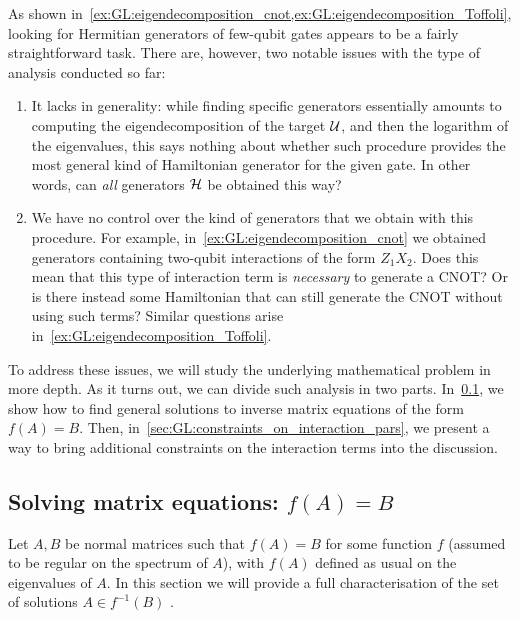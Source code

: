 As shown in~\cref{ex:GL:eigendecomposition_cnot,ex:GL:eigendecomposition_Toffoli}, looking for Hermitian generators of few-qubit gates appears to be a fairly straightforward task. There are, however, two notable issues with the type of analysis conducted so far:
\begin{enumerate}
    \item It lacks in generality: while finding specific generators essentially amounts to computing the eigendecomposition of the target ${\mathcal{U}}$, and then the logarithm of the eigenvalues, this says nothing about whether such procedure provides the most general kind of Hamiltonian generator for the given gate. In other words, can \textit{all} generators ${\mathcal{H}}$ be obtained this way?
    \item We have no control over the kind of generators that we obtain with this procedure. For example, in~\cref{ex:GL:eigendecomposition_cnot} we obtained generators containing two-qubit interactions of the form $Z_1 X_2$. Does this mean that this type of interaction term is \textit{necessary} to generate a CNOT? Or is there instead some Hamiltonian that can still generate the CNOT without using such terms?
    Similar questions arise in~\cref{ex:GL:eigendecomposition_Toffoli}.
\end{enumerate}

To address these issues, we will study the underlying mathematical problem in more depth. As it turns out, we can divide such analysis in two parts. In~\cref{sec:GL:solutions_matrix_equation_f(A)=B}, we show how to find general solutions to inverse matrix equations of the form $f(A)=B$. Then, in~\cref{sec:GL:constraints_on_interaction_pars}, we present a way to bring additional constraints on the interaction terms into the discussion.

\subsection{Solving matrix equations: \texorpdfstring{$f(A)=B$}{f(A)=B}}
\label{sec:GL:solutions_matrix_equation_f(A)=B}

Let $A,B$ be normal matrices such that $f(A)=B$ for some function $f$ (assumed to be regular on the spectrum of $A$), with $f(A)$ defined as usual on the eigenvalues of $A$.
In this section we will provide a full characterisation of the set of solutions $A\in f^{-1}(B)$ .

